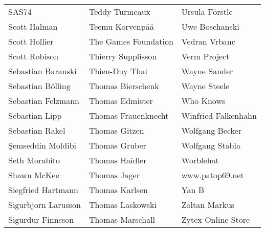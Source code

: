 \begin{tabular}{p{4.5cm}p{4.5cm}p{4.5cm}}
SAS74 & Teddy Turmeaux & Ursula Förstle \\
Scott Halman & Teemu Korvenpää & Uwe Boschanski \\
Scott Hollier & The Games Foundation & Vedran Vrbanc \\
Scott Robison & Thierry Supplisson & Verm Project \\
Sebastian Baranski & Thieu-Duy Thai & Wayne Sander \\
Sebastian Bölling & Thomas Bierschenk & Wayne Steele \\
Sebastian Felzmann & Thomas Edmister & Who Knows \\
Sebastian Lipp & Thomas Frauenknecht & Winfried Falkenhahn \\
Sebastian Rakel & Thomas Gitzen & Wolfgang Becker \\
Şemseddin Moldibi & Thomas Gruber & Wolfgang Stabla \\
Seth Morabito & Thomas Haidler & Worblehat \\
Shawn McKee & Thomas Jager & www.patop69.net \\
Siegfried Hartmann & Thomas Karlsen & Yan B \\
Sigurbjorn Larusson & Thomas Laskowski & Zoltan Markus \\
Sigurdur Finnsson & Thomas Marschall & Zytex Online Store \\
\end{tabular}
